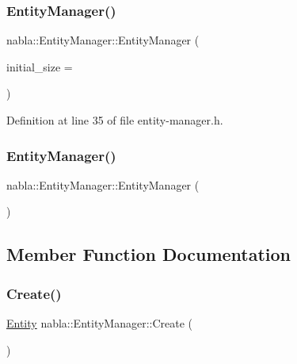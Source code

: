 \subsubsection{\texorpdfstring{EntityManager()}{EntityManager()}\hspace{0.1cm}{\footnotesize\ttfamily [1/2]}}
{\footnotesize\ttfamily nabla\+::\+Entity\+Manager\+::\+Entity\+Manager (\begin{DoxyParamCaption}\item[{size\+\_\+t}]{initial\+\_\+size = {} }\end{DoxyParamCaption})\hspace{0.3cm}{\ttfamily [inline]}}



Definition at line 35 of file entity-\/manager.\+h.

\mbox{\label{classnabla_1_1_entity_manager_a4d638392cf93db8ffd2f905d492d3844}} 
\subsubsection{\texorpdfstring{EntityManager()}{EntityManager()}\hspace{0.1cm}{\footnotesize\ttfamily [2/2]}}
{\footnotesize\ttfamily nabla\+::\+Entity\+Manager\+::\+Entity\+Manager (\begin{DoxyParamCaption}\item[{const \mbox{\hyperlink{classnabla_1_1_entity_manager}{Entity\+Manager}} \&}]{ }\end{DoxyParamCaption})\hspace{0.3cm}{\ttfamily [delete]}}



\subsection{Member Function Documentation}
\mbox{\label{classnabla_1_1_entity_manager_a8b40cde679503899a48047863dcd574b}} 
\subsubsection{\texorpdfstring{Create()}{Create()}}
{\footnotesize\ttfamily \mbox{\hyperlink{structnabla_1_1_entity}{Entity}} nabla\+::\+Entity\+Manager\+::\+Create (\begin{DoxyParamCaption}{ }\end{DoxyParamCaption})\hspace{0.3cm}{\ttfamily [inline]}}



